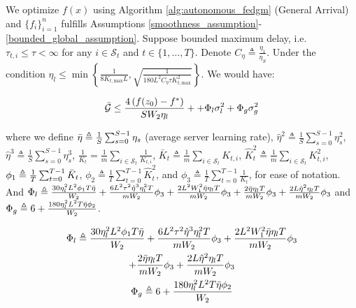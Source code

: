 \begin{corollary}
\label{multistage_fedgm_free_general_arrival_convergence_theorem}
We optimize $f(x)$ using Algorithm \ref{alg:autonomous_fedgm} (General Arrival) and $\{f_i\}_{i=1}^n$ fulfills Assumptions \ref{smoothness_assumption}-\ref{bounded_global_assumption}. Suppose bounded maximum delay, i.e. $\tau_{t,i}\leq\tau<\infty$ for any $i\in\mathcal{S}_t$ and $t\in\{1,\dots,T\}$. Denote $C_\eta\triangleq\frac{\eta_1}{\eta_S}$. Under the condition $\eta_l\leq\min\left\{\frac{1}{8K_{t,\text{max}}L},\sqrt{\frac{1}{ 180L^2 C_\eta \tau K_{t,\text{max}}^2}}\right\}$. We would have:


\begin{gather*}
\Bar{\mathcal{G}}
\leq \frac{4 \left(f(z_0) - f^\ast  \right)}{S W_2 \eta_l} + 
+\Phi_l \sigma_l^2 
+ \Phi_g \sigma_g^2
\label{multistage_fedgm_free_general_arrival_bound}
\end{gather*}


where we define $\Bar{\eta}\triangleq\frac{1}{S}\sum_{s=0}^{S-1}\eta_s$ (average server learning rate), $\hat{\eta}^2\triangleq\frac{1}{S}\sum_{s=0}^{S-1}\eta^2_s$, $\hat{\eta}^3\triangleq\frac{1}{S}\sum_{s=0}^{S-1}\eta^3_s$, $\frac{1}{K_t}=\frac{1}{m}\sum_{i\in\mathcal{S}_t}\frac{1}{K_{t,i}}$, $\bar{K}_t\triangleq \frac{1}{m}\sum_{i\in\mathcal{S}_t}K_{t,i}$, $\hat{K}_t^2 \triangleq \frac{1}{m}\sum_{i\in\mathcal{S}_t}K^2_{t,i}$, $\phi_1 \triangleq  \frac{1}{T}\sum_{t=0}^{T-1} \Bar{K}_t$, $\phi_2 \triangleq  \frac{1}{T}\sum_{t=0}^{T-1} \hat{K}_t^2$, and $\phi_3 \triangleq \frac{1}{T}\sum_{t=0}^{T-1} \frac{1}{K_t}$, for ease of notation. And $\Phi_l \triangleq \frac{30  \eta^2_l L^2 \phi_1 T \Bar{\eta}}{W_2}  + \frac{6 L^2 \tau^2 \hat{\eta}^3 \eta_l^2 T}{m W_2} \phi_3 + \frac{ 2 L^2 W_1^2 \Bar{\eta}\eta_l T}{m W_2} \phi_3 + \frac{2 \Bar{\eta}\eta_l T}{m W_2} \phi_3 + \frac{2 L \hat{\eta}^2 \eta_l T}{m W_2} \phi_3$ and $\Phi_g \triangleq 6 + \frac{180 \eta^2_l L^2 T \Bar{\eta}\phi_2 }{W_2}$.



\begin{gather*}
\Phi_l \triangleq \frac{30  \eta^2_l L^2 \phi_1 T \Bar{\eta}}{W_2}  + \frac{6 L^2 \tau^2 \hat{\eta}^3 \eta_l^2 T}{m W_2} \phi_3 + \frac{ 2 L^2 W_1^2 \Bar{\eta}\eta_l T}{m W_2} \phi_3 \\
+ \frac{2 \Bar{\eta}\eta_l T}{m W_2} \phi_3 + \frac{2 L \hat{\eta}^2 \eta_l T}{m W_2} \phi_3 \\
\Phi_g \triangleq 6 + \frac{180 \eta^2_l L^2 T \Bar{\eta}\phi_2 }{W_2}
\nonumber
\end{gather*}



\end{corollary}
